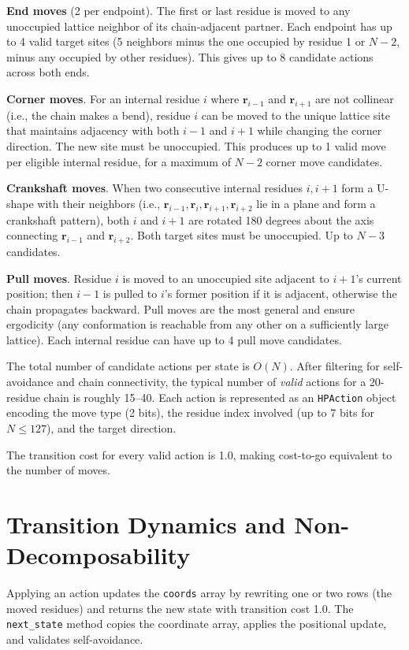 \documentclass[11pt]{article}
\begin{document}
\textbf{End moves} (2 per endpoint). The first or last residue is moved to any unoccupied lattice neighbor of its chain-adjacent partner. Each endpoint has up to 4 valid target sites (5 neighbors minus the one occupied by residue 1 or $N{-}2$, minus any occupied by other residues). This gives up to 8 candidate actions across both ends.

\textbf{Corner moves}. For an internal residue $i$ where $\mathbf{r}_{i-1}$ and $\mathbf{r}_{i+1}$ are not collinear (i.e., the chain makes a bend), residue $i$ can be moved to the unique lattice site that maintains adjacency with both $i{-}1$ and $i{+}1$ while changing the corner direction. The new site must be unoccupied. This produces up to 1 valid move per eligible internal residue, for a maximum of $N{-}2$ corner move candidates.

\textbf{Crankshaft moves}. When two consecutive internal residues $i, i{+}1$ form a U-shape with their neighbors (i.e., $\mathbf{r}_{i-1}, \mathbf{r}_i, \mathbf{r}_{i+1}, \mathbf{r}_{i+2}$ lie in a plane and form a crankshaft pattern), both $i$ and $i{+}1$ are rotated 180 degrees about the axis connecting $\mathbf{r}_{i-1}$ and $\mathbf{r}_{i+2}$. Both target sites must be unoccupied. Up to $N{-}3$ candidates.

\textbf{Pull moves}. Residue $i$ is moved to an unoccupied site adjacent to $i{+}1$'s current position; then $i{-}1$ is pulled to $i$'s former position if it is adjacent, otherwise the chain propagates backward. Pull moves are the most general and ensure ergodicity (any conformation is reachable from any other on a sufficiently large lattice). Each internal residue can have up to 4 pull move candidates.

The total number of candidate actions per state is $O(N)$. After filtering for self-avoidance and chain connectivity, the typical number of \textit{valid} actions for a 20-residue chain is roughly 15--40. Each action is represented as an \texttt{HPAction} object encoding the move type (2 bits), the residue index involved (up to 7 bits for $N \leq 127$), and the target direction.

The transition cost for every valid action is 1.0, making cost-to-go equivalent to the number of moves.


\section{Transition Dynamics and Non-Decomposability}

Applying an action updates the \texttt{coords} array by rewriting one or two rows (the moved residues) and returns the new state with transition cost 1.0. The \texttt{next\_state} method copies the coordinate array, applies the positional update, and validates self-avoidance.
\end{document}
